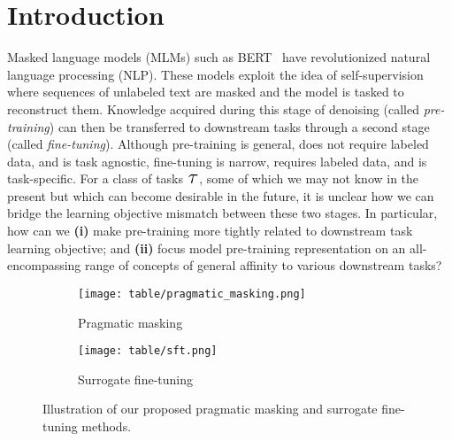 \section{Introduction}\label{sec:intro}
Masked language models (MLMs) such as BERT~\cite{devlin-2019-bert} have revolutionized natural language processing (NLP). These models exploit the idea of self-supervision where sequences of unlabeled text are masked and the model is tasked to reconstruct them. Knowledge acquired during this stage of denoising (called \textit{pre-training}) can then be transferred to downstream tasks through a second stage (called \textit{fine-tuning}). Although pre-training is general, does not require labeled data, and is task agnostic, fine-tuning is narrow, requires labeled data, and is task-specific. For a class of tasks $\Tau$, some of which we may not know in the present but which can become desirable in the future, it is unclear how we can bridge the learning objective mismatch between these two stages. In particular, how can we \textbf{(i)} make pre-training more tightly related to downstream task learning objective; and \textbf{(ii)} focus model pre-training representation on an all-encompassing range of concepts of general affinity to various downstream tasks?

\begin{figure}[t]
\centering
\begin{subfigure}[]{\linewidth}
  \centering
  \texttt{[image: table/pragmatic\_masking.png]}
  \caption{Pragmatic masking}\label{fig:pm}
\end{subfigure} 
\begin{subfigure}[]{\linewidth}
  \centering
  \texttt{[image: table/sft.png]}
  \caption{Surrogate fine-tuning}\label{fig:sft}
\end{subfigure}
\caption{Illustration of our proposed pragmatic masking and surrogate fine-tuning methods.}
\end{figure}

